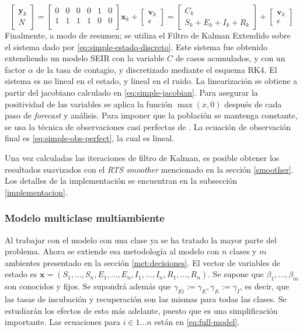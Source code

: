 \begin{equation} \label{eq:simple-obs-perfect}
\begin{bmatrix}
\mathbf{y}_{k} \\
N
\end{bmatrix} = 
\begin{bmatrix}
0 & 0 & 0 & 0 & 1 & 0 \\
1 & 1 & 1 & 1 & 0 & 0 \\
\end{bmatrix}
\mathbf{x}_{k} + 
\begin{bmatrix}
\mathbf{v}_k \\
\epsilon
\end{bmatrix} =
\begin{bmatrix}
C_k \\
S_k + E_k + I_k + R_k
\end{bmatrix}
 + 
\begin{bmatrix}
\mathbf{v}_k \\
\epsilon
\end{bmatrix}
\end{equation}
Finalmente, a modo de resumen; se utiliza el Filtro de Kalman Extendido sobre el sistema dado por \ref{eq:simple-estado-discreto}. Este sistema fue obtenido extendiendo un modelo SEIR con la variable \(C\) de casos acumulados, y con un factor \(\alpha\) de la tasa de contagio, y discretizado mediante el esquema RK4. El sistema es no lineal en el estado, y lineal en el ruido. La linearización se obtiene a partir del jacobiano calculado en \ref{eq:simple-jacobian}. Para asegurar la positividad de las variables se aplica la función \(\max(x, 0)\) después de cada paso de \textit{forecast} y análisis. Para imponer que la población se mantenga constante, se usa la técnica de observaciones casi perfectas de \cite{Simon2010}. La ecuación de observación final es \ref{eq:simple-obs-perfect}, la cual es lineal.

Una vez calculadas las iteraciones de filtro de Kalman, es posible obtener los resultados suavizados con el \textit{RTS smoother} mencionado en la sección \ref{smoother}. Los detalles de la implementación se encuentran en la subsección \ref{implementacion}.



\subsubsection*{Modelo multiclase multiambiente}

Al trabajar con el modelo con una clase ya se ha tratado la mayor parte del problema. Ahora se extiende esa metodología al modelo con \(n\) clases y \(m\) ambientes presentado en la sección \ref{met:decisiones}. El vector de variables de estado es \(\mathbf{x} = (S_1, \dots, S_n, E_1, \dots, E_n, I_1, \dots, I_n, R_1, \dots, R_n)\). Se supone que \(\beta_1, \dots, \beta_m\) son conocidos y fijos. Se supondrá además que \(\gamma_{Ei} := \gamma_E, \gamma_{Ii}:=\gamma_I\), es decir, que las tasas de incubación y recuperación son las mismas para todas las clases. Se estudiarán los efectos de esto más adelante, puesto que es una simplificación importante. Las ecuaciones para \(i \in 1\dots n\) están en \ref{eq:full-model}.


